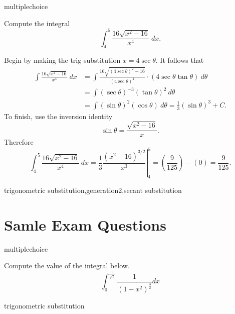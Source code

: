 \documentclass{ximera}
\begin{document}
\begin{question}[TrigSub033]
\begin{type}
multiplechoice
\end{type}
Compute the integral 
\[\int_{4}^{5}\frac{16\sqrt{x^2-16}}{x^{4}}~dx.\]
\begin{multiplechoice}
\end{multiplechoice}
\begin{feedback}
Begin by making the trig substitution \(x=4\sec \theta\). It follows that 
\[ \begin{aligned} \int\frac{16\sqrt{x^2-16}}{x^{4}}~dx & = \int \frac{16\sqrt{(4\sec \theta)^2-16}}{(4\sec \theta)^{4}} \cdot (4\sec \theta\tan \theta)~d \theta \\
 & = \int (\sec \theta)^{-3}(\tan \theta)^{2}~d \theta \\ & = \int (\sin \theta)^{2}(\cos \theta) ~ d \theta = \frac{1}{3}(\sin \theta)^{3} + C. \end{aligned} \]
To finish, use the inversion identity \[\sin \theta = \frac{\sqrt{x^2-16}}{x}.\]
Therefore \[\int_{4}^{5}\frac{16\sqrt{x^2-16}}{x^{4}}~dx = \left.\frac{1}{3}\frac{(x^2-16)^{3/2}}{x^{3}}\right|_{4}^{5} = \left(\frac{9}{125}\right) - \left(0\right) = \frac{9}{125}.\]
\end{feedback}
\begin{keywords}
trigonometric substitution,generation2,secant substitution
\end{keywords}
\end{question}



\section*{Samle Exam Questions}

\begin{question}[2016C.03]
\begin{type}
multiplechoice
\end{type}
Compute the value of the integral below.
\[ \int_0^{\frac{1}{\sqrt{2}}} \frac{1}{(1-x^2)^{\frac{3}{2}}} dx \]
\begin{multiplechoice}
\end{multiplechoice}
\begin{keywords}
trigonometric substitution
\end{keywords}
\end{question}
\end{document}
